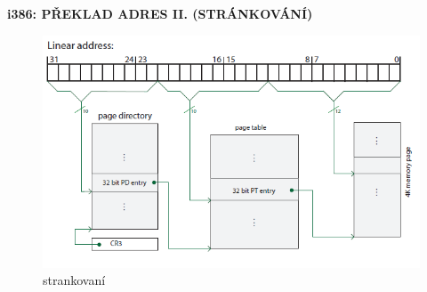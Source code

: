 \documentclass[10pt,a4paper]{article}
\begin{document}
\textbf{i386: PŘEKLAD ADRES II. (STRÁNKOVÁNÍ)}
\begin{figure} [h]
	\includegraphics[scale=0.8]{img/strankovani.png}
	\caption{strankovaní}	
\end{figure}
\end{document}
